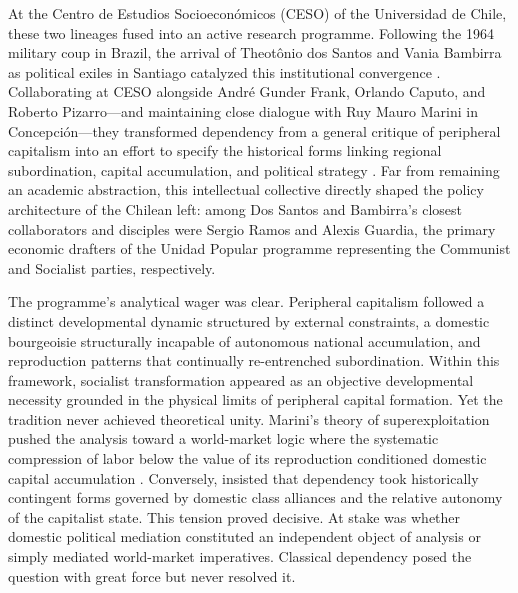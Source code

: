 At the Centro de Estudios Socioeconómicos (CESO) of the Universidad de Chile, 
these two lineages fused into an active research programme. Following the 1964 military coup 
in Brazil, the arrival of Theotônio dos Santos and Vania Bambirra as political exiles in Santiago 
catalyzed this institutional convergence \citep{CardenasSeabra2022}. Collaborating at CESO 
alongside André Gunder Frank, Orlando Caputo, and Roberto Pizarro—and maintaining close dialogue 
with Ruy Mauro Marini in Concepción—they transformed dependency from a general critique of 
peripheral capitalism into an effort to specify the historical forms linking regional subordination, 
capital accumulation, and political strategy \citep{DosSantos1970,Bambirra1971,CaputoPizarro1970,Kay2010}. 
Far from remaining an academic abstraction, this intellectual collective directly shaped the policy 
architecture of the Chilean left: among Dos Santos and Bambirra's closest collaborators and disciples 
were Sergio Ramos and Alexis Guardia, the primary economic drafters of the Unidad Popular programme 
representing the Communist and Socialist parties, respectively.

The programme's analytical wager was clear. Peripheral capitalism followed a distinct 
developmental dynamic structured by external constraints, a domestic bourgeoisie structurally 
incapable of autonomous national accumulation, and reproduction patterns that continually 
re-entrenched subordination. Within this framework, socialist transformation appeared as an 
objective developmental necessity grounded in the physical limits of peripheral capital formation. 
Yet the tradition never achieved theoretical unity. Marini's theory of superexploitation pushed 
the analysis toward a world-market logic where the systematic compression of labor below the value 
of its reproduction conditioned domestic capital accumulation \citep{Marini1973}. Conversely, 
\citet{CardosoFaletto1979} insisted that dependency took historically contingent forms governed 
by domestic class alliances and the relative autonomy of the capitalist state. This tension proved 
decisive. At stake was whether domestic political mediation constituted an independent object 
of analysis or simply mediated world-market imperatives. Classical dependency posed the question 
with great force but never resolved it.


